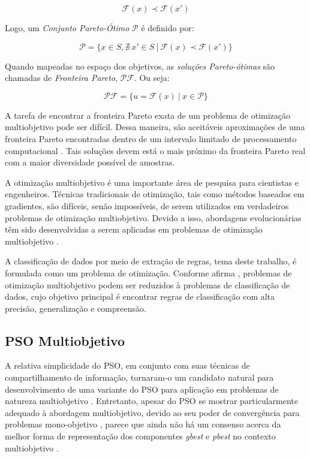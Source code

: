 \documentclass[
	12pt,				%
	openany,			%
	oneside,	
	a4paper,			%
	brazil,				%
	]{unimontes-ppgmsc-abntex2}
\begin{document}
\begin{equation}
\label{eq:dominancia}
\mathcal{F}(x) \prec \mathcal{F}(x')
\end{equation}

Logo, um {\em Conjunto Pareto-Ótimo} $\mathcal{P}$ é definido por:

\begin{equation}
\label{eq:conj_pareto}
\mathcal{P} = \{x \in S, \nexists\ x' \in S\ |\ \mathcal{F}(x) \prec \mathcal{F}(x')\}
\end{equation}

Quando mapeadas no espaço dos objetivos, as {\em soluções Pareto-ótimas} são chamadas de {\em Fronteira Pareto}, $\mathcal{PF}$. Ou seja:

\begin{equation}
\label{eq:front_pareto}
\mathcal{PF} = \{ u = \mathcal{F}(x)\ |\ x \in \mathcal{P} \}
\end{equation}

A tarefa de encontrar a fronteira Pareto exata de um problema de otimização multiobjetivo pode ser difícil. Dessa maneira, são aceitáveis aproximações de uma fronteira Pareto encontradas dentro de um intervalo limitado de processamento computacional \cite{Coello_2006}. Tais soluções devem está o mais próximo da fronteira Pareto real com a maior diversidade possível de amostras. 

A otimização multiobjetivo é uma importante área de pesquisa para cientistas e engenheiros. Técnicas tradicionais de otimização, tais como métodos baseados em gradientes, são difíceis, senão impossíveis, de serem utilizados em verdadeiros problemas de otimização multiobjetivo. Devido a isso, abordagens evolucionárias têm sido desenvolvidas a serem aplicadas em problemas de otimização multiobjetivo \cite{Hu_2003}. 

A classificação de dados por meio de extração de regras, tema deste trabalho, é formulada como um problema de otimização. Conforme afirma , problemas de otimização multiobjetivo podem ser reduzidos à problemas de classificação de dados, cujo objetivo principal é encontrar regras de classificação com alta precisão, generalização e compreensão. 


\subsection{PSO Multiobjetivo}
\label{sec:pso_mult}

A relativa simplicidade do PSO, em conjunto com suas técnicas de compartilhamento de informação, tornaram-o um candidato natural para desenvolvimento de uma variante do PSO para aplicação em problemas de natureza multiobjetivo \cite{Mishra_2016}. Entretanto, apesar do PSO se mostrar particularmente adequado à abordagem multiobjetivo, devido ao seu poder de convergência para problemas mono-objetivo \cite{Coello_2004}, parece que ainda não há um consenso acerca da melhor forma de representação dos componentes {\em gbest} e {\em pbest} no contexto multiobjetivo \cite{Reddy_2007}. 
\end{document}
